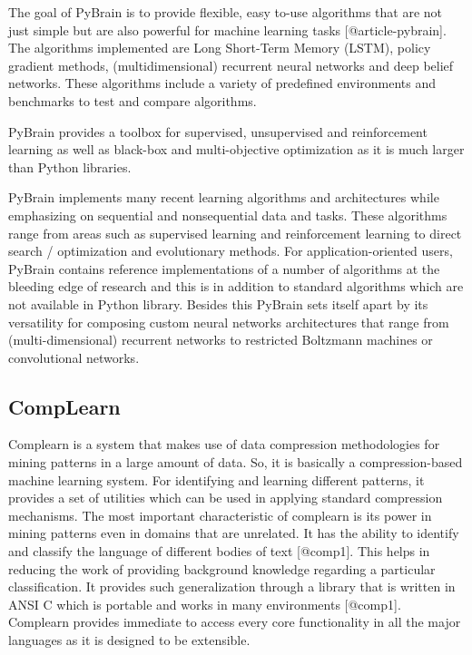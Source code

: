 The goal of PyBrain is to provide flexible, easy to-use algorithms
that are not just simple but are also powerful for machine learning
tasks [@article-pybrain].  The algorithms implemented are Long
Short-Term Memory (LSTM), policy gradient methods, (multidimensional)
recurrent neural networks and deep belief networks. These algorithms
include a variety of predefined environments and benchmarks to test
and compare algorithms.

PyBrain provides a toolbox for supervised, unsupervised and
reinforcement learning as well as black-box and multi-objective
optimization as it is much larger than Python libraries.

PyBrain implements many recent learning algorithms and architectures
while emphasizing on sequential and nonsequential data and
tasks. These algorithms range from areas such as supervised learning
and reinforcement learning to direct search / optimization and
evolutionary methods.  For application-oriented users, PyBrain
contains reference implementations of a number of algorithms at the
bleeding edge of research and this is in addition to standard
algorithms which are not available in Python library. Besides this
PyBrain sets itself apart by its versatility for composing custom
neural networks architectures that range from (multi-dimensional)
recurrent networks to restricted Boltzmann machines or convolutional
networks.


    
\subsection{CompLearn}

Complearn is a system that makes use of data compression methodologies
for mining patterns in a large amount of data. So, it is basically a
compression-based machine learning system. For identifying and
learning different patterns, it provides a set of utilities which can
be used in applying standard compression mechanisms. The most
important characteristic of complearn is its power in mining patterns
even in domains that are unrelated. It has the ability to identify and
classify the language of different bodies of text [@comp1]. This
helps in reducing the work of providing background knowledge regarding
a particular classification. It provides such generalization through a
library that is written in ANSI C which is portable and works in many
environments [@comp1]. Complearn provides immediate to access
every core functionality in all the major languages as it is designed
to be extensible.

